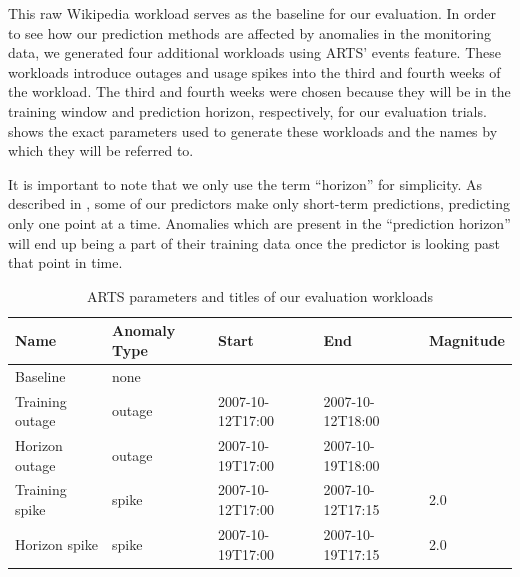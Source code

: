 This raw Wikipedia workload serves as the baseline for our evaluation. In order to see how our prediction methods are affected by anomalies in the monitoring data, we generated four additional workloads using ARTS' events feature. These workloads introduce outages and usage spikes into the third and fourth weeks of the workload. The third and fourth weeks were chosen because they will be in the training window and prediction horizon, respectively, for our evaluation trials.  shows the exact parameters used to generate these workloads and the names by which they will be referred to.

It is important to note that we only use the term ``horizon'' for simplicity. As described in , some of our predictors make only short-term predictions, predicting only one point at a time. Anomalies which are present in the ``prediction horizon'' will end up being a part of their training data once the predictor is looking past that point in time.

\begin{table}
\centering
\begin{tabular}{| l | l | l | l | l |}
\hline
Name & Anomaly Type & Start & End & Magnitude \\ \hline
Baseline & none & & & \\ \hline
Training outage & outage & 2007-10-12T17:00 & 2007-10-12T18:00 & \\ \hline
Horizon outage & outage & 2007-10-19T17:00 & 2007-10-19T18:00 & \\ \hline
Training spike & spike & 2007-10-12T17:00 & 2007-10-12T17:15 & 2.0 \\ \hline
Horizon spike & spike & 2007-10-19T17:00 & 2007-10-19T17:15 & 2.0 \\ \hline
\end{tabular}
\caption{ARTS parameters and titles of our evaluation workloads}
\label{tab:workloads}
\end{table}